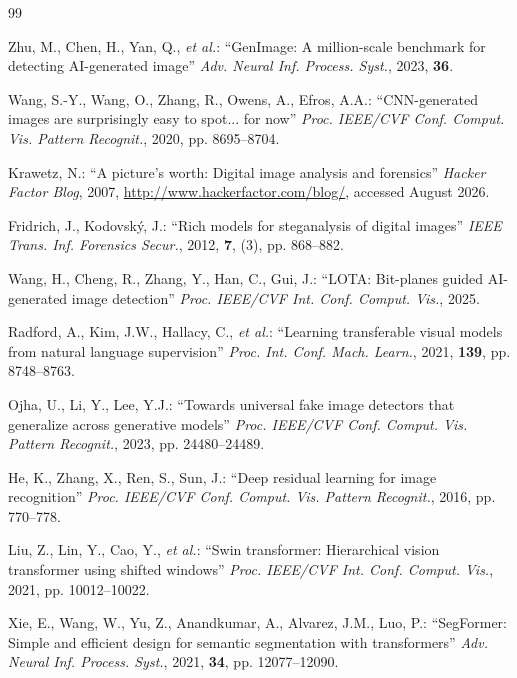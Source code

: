 \documentclass[11pt,a4paper]{article}
\begin{document}
\begin{thebibliography}{99}

Zhu, M., Chen, H., Yan, Q., \emph{et al.}: ``GenImage: A million-scale benchmark for detecting AI-generated image'' \emph{Adv. Neural Inf. Process. Syst.}, 2023, \textbf{36}.

Wang, S.-Y., Wang, O., Zhang, R., Owens, A., Efros, A.A.: ``CNN-generated images are surprisingly easy to spot... for now'' \emph{Proc. IEEE/CVF Conf. Comput. Vis. Pattern Recognit.}, 2020, pp. 8695--8704.

Krawetz, N.: ``A picture's worth: Digital image analysis and forensics'' \emph{Hacker Factor Blog}, 2007, \url{http://www.hackerfactor.com/blog/}, accessed August 2026.

Fridrich, J., Kodovsk\'{y}, J.: ``Rich models for steganalysis of digital images'' \emph{IEEE Trans. Inf. Forensics Secur.}, 2012, \textbf{7}, (3), pp. 868--882.

Wang, H., Cheng, R., Zhang, Y., Han, C., Gui, J.: ``LOTA: Bit-planes guided AI-generated image detection'' \emph{Proc. IEEE/CVF Int. Conf. Comput. Vis.}, 2025.

Radford, A., Kim, J.W., Hallacy, C., \emph{et al.}: ``Learning transferable visual models from natural language supervision'' \emph{Proc. Int. Conf. Mach. Learn.}, 2021, \textbf{139}, pp. 8748--8763.

Ojha, U., Li, Y., Lee, Y.J.: ``Towards universal fake image detectors that generalize across generative models'' \emph{Proc. IEEE/CVF Conf. Comput. Vis. Pattern Recognit.}, 2023, pp. 24480--24489.

He, K., Zhang, X., Ren, S., Sun, J.: ``Deep residual learning for image recognition'' \emph{Proc. IEEE/CVF Conf. Comput. Vis. Pattern Recognit.}, 2016, pp. 770--778.

Liu, Z., Lin, Y., Cao, Y., \emph{et al.}: ``Swin transformer: Hierarchical vision transformer using shifted windows'' \emph{Proc. IEEE/CVF Int. Conf. Comput. Vis.}, 2021, pp. 10012--10022.

Xie, E., Wang, W., Yu, Z., Anandkumar, A., Alvarez, J.M., Luo, P.: ``SegFormer: Simple and efficient design for semantic segmentation with transformers'' \emph{Adv. Neural Inf. Process. Syst.}, 2021, \textbf{34}, pp. 12077--12090.


\end{thebibliography}
\end{document}
